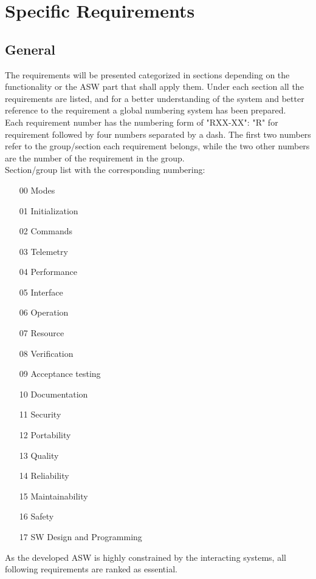 
\chapter{Specific Requirements}

\section{General}

The requirements will be presented categorized in sections depending on the functionality or the ASW part that shall apply them. Under each section all the requirements are listed, and for a better understanding of the system and better reference to the requirement a global numbering system has been prepared.\\

Each requirement number has the numbering form of "RXX-XX": "R" for requirement followed by four numbers separated by a dash. The first two numbers refer to the group/section each requirement belongs, while the two other numbers are the number of the requirement in the group.\\

Section/group list with the corresponding numbering:
\begin{enumerate}
\item[00] Modes
\item[01] Initialization
\item[02] Commands
\item[03] Telemetry
\item[04] Performance
\item[05] Interface
\item[06] Operation
\item[07] Resource
\item[08] Verification
\item[09] Acceptance testing
\item[10] Documentation
\item[11] Security
\item[12] Portability
\item[13] Quality
\item[14] Reliability
\item[15] Maintainability
\item[16] Safety
\item[17] SW Design and Programming
\end{enumerate}

As the developed ASW is highly constrained by the interacting systems, all following requirements are ranked as essential.

